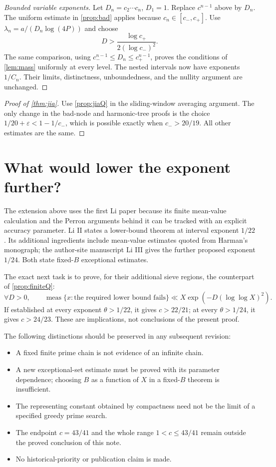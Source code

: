 \documentclass[11pt,a4paper]{article}
\theoremstyle{remark}
\newcommand{\meas}{\operatorname{meas}}
\newcommand{\eps}{\varepsilon}
\begin{document}
\begin{proof}[Bounded variable exponents]
Let $D_n=c_2\cdots c_n$, $D_1=1$.
Replace $c^{n-1}$ above by $D_n$.
The uniform estimate in \cref{prop:bad} applies because
$c_n\in[c_-,c_+]$.
Use $\lambda_n=a/(D_n\log(4P))$ and choose
\[
                 D>\frac{\log c_+}{2(\log c_-)^2}.
\]
The same comparison, using $c_-^{n-1}\le D_n\le c_+^{n-1}$, proves
the conditions of \cref{lem:mass} uniformly at every level.
The nested intervals now have exponents $1/C_n$.
Their limits, distinctness, unboundedness, and the nullity argument
are unchanged.
\end{proof}

\begin{proof}[Proof of \cref{thm:jia}]
Use \cref{prop:jiaQ} in the sliding-window averaging argument.
The only change in the bad-node and harmonic-tree proofs is the
choice $1/20+\eps<1-1/c_-$, which is possible exactly when
$c_->20/19$. All other estimates are the same.
\end{proof}

\section{What would lower the exponent further?}

The extension above uses the first Li paper because its finite
mean-value calculation and the Perron arguments behind it can be
tracked with an explicit accuracy parameter.
Li II states a lower-bound theorem at interval exponent $1/22$.
Its additional ingredients include mean-value estimates quoted from
Harman's monograph; the author-site manuscript Li III gives the
further proposed exponent $1/24$.
Both state fixed-$B$ exceptional estimates.

The exact next task is to prove, for their additional sieve regions,
the counterpart of \cref{prop:finiteQ}:
\[
 \forall D>0,\qquad
 \meas\{x:\text{the required lower bound fails}\}
             \ll X\exp(-D(\log\log X)^2).
\]
If established at every exponent $\theta>1/22$, it gives
$c>22/21$; at every $\theta>1/24$, it gives $c>24/23$.
These are implications, not conclusions of the present proof.

The following distinctions should be preserved in any subsequent
revision:
\begin{itemize}[leftmargin=1.5em]
\item A fixed finite prime chain is not evidence of an infinite chain.
\item A new exceptional-set estimate must be proved with its parameter
      dependence; choosing $B$ as a function of $X$ in a fixed-$B$
      theorem is insufficient.
\item The representing constant obtained by compactness need not be
      the limit of a specified greedy prime search.
\item The endpoint $c=43/41$ and the whole range $1<c\le43/41$
      remain outside the proved conclusion of this note.
\item No historical-priority or publication claim is made.
\end{itemize}
\end{document}
